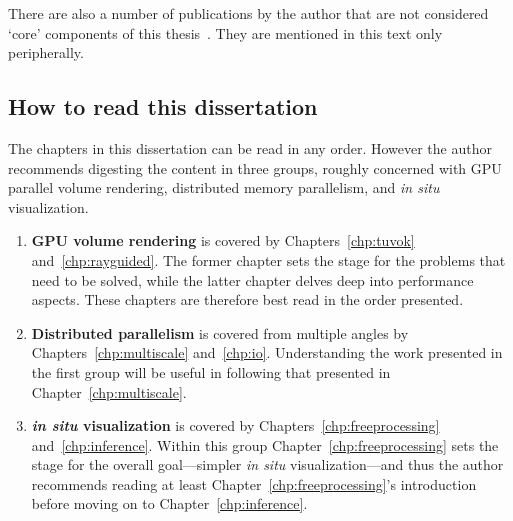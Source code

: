 There are also a number of publications by the author that are not
considered
`core' components of this thesis~\cite{Fogal:2009:SizeMatters,
Fogal:2010:Bridge, Jevremovic:2011:Education, Jovana:2012:Interactive,
Brownlee:2012:GLuRay, Childs:2012:VisIt, Hernandez:2013:Steering,
Butson:2013:DBS}.  They are mentioned in this text only peripherally.

\subsection{How to read this dissertation}

The chapters in this dissertation can be read in any order.  However
the author recommends digesting the content in three groups, roughly
concerned with GPU parallel volume rendering, distributed memory
parallelism, and
\textit{in situ} visualization.

\begin{enumerate}

  \item \textbf{GPU volume rendering} is covered by
  Chapters~\ref{chp:tuvok} and~\ref{chp:rayguided}.  The former chapter
  sets the stage for the problems that need to be solved, while the
  latter chapter delves deep into performance aspects.  These chapters
  are therefore best read in the order presented.

  \item \textbf{Distributed parallelism} is covered from multiple
  angles by Chapters~\ref{chp:multiscale} and~\ref{chp:io}.
  Understanding the work presented in the first group will be useful in
  following that presented in Chapter~\ref{chp:multiscale}.

  \item \textbf{\textit{in situ} visualization} is covered by
  Chapters~\ref{chp:freeprocessing} and~\ref{chp:inference}.  Within
  this group Chapter~\ref{chp:freeprocessing} sets the stage for the
  overall goal---simpler \textit{in situ} visualization---and thus the
  author recommends reading at least Chapter~\ref{chp:freeprocessing}'s
  introduction before moving on to Chapter~\ref{chp:inference}.

\end{enumerate}
